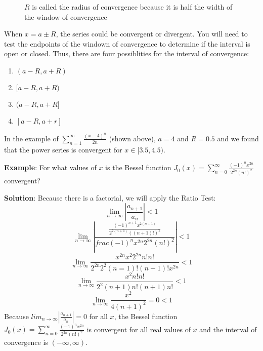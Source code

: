 \begin{figure}[htbp]
\centering
    \caption{$R$ is called the radius of convergence because it is half the 
    width of the window of convergence}
    \label{fig:radiusofconv}
\end{figure}

When $x = a \pm R$, the series could be convergent or divergent. You will need 
to test the endpoints of the windown of convergence to determine if the 
interval is open or closed. Thus, there are four possiblities for the interval 
of convergence:

\begin{enumerate}
\item $(a - R, a + R)$
\item$[a - R, a + R)$
\item$(a - R, a + R]$
\item$[a - R, a + r]$
\end{enumerate}

In the example of $\sum_{n=1}^\infty \frac{(x-4)^n}{2n}$ (shown above), 
$a = 4$ and $R = 0.5$ and we found that the power series is convergent for 
$x \in [3.5, 4.5)$. 

\textbf{Example}: For what values of $x$ is the Bessel function $J_0 (x) = 
\sum_{n=0}^\infty \frac{(-1)^n x^{2n}}{2^{2n}(n!)^2}$ convergent? 

\textbf{Solution}: Because there is a factorial, we will apply the Ratio Test:
$$\lim_{n \to \infty} \left| \frac{a_{n + 1}}{a_n} \right| <  1$$
$$\lim_{n \to \infty} \left| \frac{\frac{(-1)^{n + 1} x^{2(n + 1)}}{2^{2(n + 1
)}((n + 1)!)^2}}{frac{(-1)^n x^{2n}}{2^{2n}(n!)^2}} \right| < 1$$
$$\lim_{n \to \infty} \frac{x^{2n} x^2 2^{2n} n! n!}{2^{2n} 2^2 (n = 1)! (n + 
1)! x^{2n}} < 1$$
$$\lim_{n \to \infty} \frac{x^2 n! n!}{2^2 (n + 1)n! (n + 1)n!} < 1$$
$$\lim_{n \to \infty} \frac{x^2}{4(n + 1)^2} = 0 < 1$$
Because $lim_{n \to \infty} \left| \frac{a_{n + 1}}{a_n} \right| = 0$ for all 
$x$, the Bessel function $J_0 (x) = \sum_{n=0}^\infty \frac{(-1)^n x^{2n}}{2^{
2n}(n!)^2}$ is convergent for all real values of $x$ and the interval of 
convergence is $(-\infty, \infty)$. 

